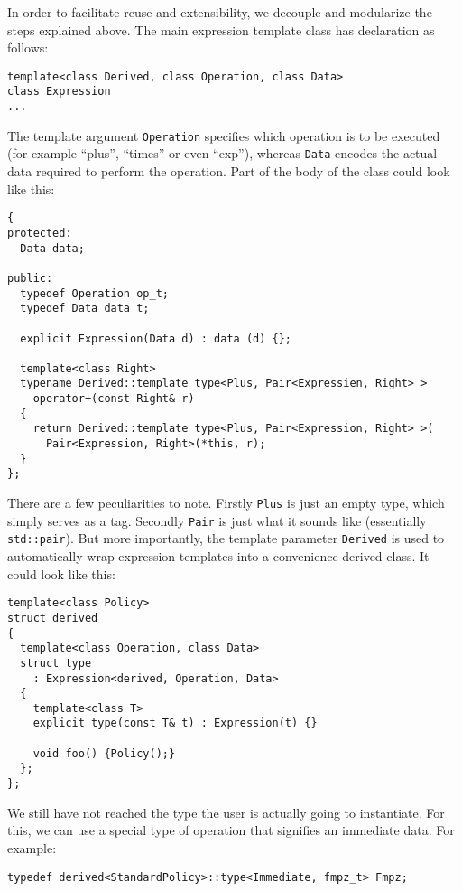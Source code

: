 \documentclass{scrartcl}
\begin{document}
In order to facilitate reuse and extensibility, we decouple and modularize
the steps explained above. The main expression template class has
declaration as follows:

\begin{verbatim}
template<class Derived, class Operation, class Data>
class Expression
...
\end{verbatim}

The template argument \texttt{Operation} specifies which operation is to be
executed (for example ``plus'', ``times'' or even ``exp''), whereas
\texttt{Data} encodes the actual data required to perform the operation.
Part of the body of the class could look like this:

\begin{verbatim}
{
protected:
  Data data;

public:
  typedef Operation op_t;
  typedef Data data_t;

  explicit Expression(Data d) : data (d) {};

  template<class Right>
  typename Derived::template type<Plus, Pair<Expressien, Right> >
    operator+(const Right& r)
  {
    return Derived::template type<Plus, Pair<Expression, Right> >(
      Pair<Expression, Right>(*this, r);
  }
};
\end{verbatim}

There are a few peculiarities to note. Firstly \texttt{Plus} is just
an empty type, which simply serves as a tag. Secondly \texttt{Pair} is just
what it sounds like (essentially \texttt{std::pair}). But more importantly,
the template parameter \texttt{Derived} is used to automatically wrap
expression templates into a convenience derived class. It could look like
this:

\begin{verbatim}
template<class Policy>
struct derived
{
  template<class Operation, class Data>
  struct type
    : Expression<derived, Operation, Data>
  {
    template<class T>
    explicit type(const T& t) : Expression(t) {}

    void foo() {Policy();}
  };
};
\end{verbatim}

We still have not reached the type the user is actually going to
instantiate. For this, we can use a special type of operation that
signifies an immediate data. For example:

\begin{verbatim}
typedef derived<StandardPolicy>::type<Immediate, fmpz_t> Fmpz;
\end{verbatim}
\end{document}
